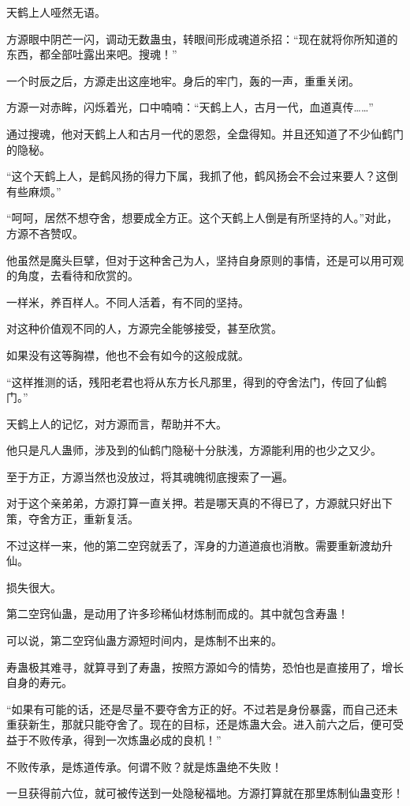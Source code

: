 \begin{this_body}
天鹤上人哑然无语。

方源眼中阴芒一闪，调动无数蛊虫，转眼间形成魂道杀招：“现在就将你所知道的东西，都全部吐露出来吧。搜魂！”

一个时辰之后，方源走出这座地牢。身后的牢门，轰的一声，重重关闭。

方源一对赤眸，闪烁着光，口中喃喃：“天鹤上人，古月一代，血道真传……”

通过搜魂，他对天鹤上人和古月一代的恩怨，全盘得知。并且还知道了不少仙鹤门的隐秘。

“这个天鹤上人，是鹤风扬的得力下属，我抓了他，鹤风扬会不会过来要人？这倒有些麻烦。”

“呵呵，居然不想夺舍，想要成全方正。这个天鹤上人倒是有所坚持的人。”对此，方源不吝赞叹。

他虽然是魔头巨擘，但对于这种舍己为人，坚持自身原则的事情，还是可以用可观的角度，去看待和欣赏的。

一样米，养百样人。不同人活着，有不同的坚持。

对这种价值观不同的人，方源完全能够接受，甚至欣赏。

如果没有这等胸襟，他也不会有如今的这般成就。

“这样推测的话，残阳老君也将从东方长凡那里，得到的夺舍法门，传回了仙鹤门。”

天鹤上人的记忆，对方源而言，帮助并不大。

他只是凡人蛊师，涉及到的仙鹤门隐秘十分肤浅，方源能利用的也少之又少。

至于方正，方源当然也没放过，将其魂魄彻底搜索了一遍。

对于这个亲弟弟，方源打算一直关押。若是哪天真的不得已了，方源就只好出下策，夺舍方正，重新复活。

不过这样一来，他的第二空窍就丢了，浑身的力道道痕也消散。需要重新渡劫升仙。

损失很大。

第二空窍仙蛊，是动用了许多珍稀仙材炼制而成的。其中就包含寿蛊！

可以说，第二空窍仙蛊方源短时间内，是炼制不出来的。

寿蛊极其难寻，就算寻到了寿蛊，按照方源如今的情势，恐怕也是直接用了，增长自身的寿元。

“如果有可能的话，还是尽量不要夺舍方正的好。不过若是身份暴露，而自己还未重获新生，那就只能夺舍了。现在的目标，还是炼蛊大会。进入前六之后，便可受益于不败传承，得到一次炼蛊必成的良机！”

不败传承，是炼道传承。何谓不败？就是炼蛊绝不失败！

一旦获得前六位，就可被传送到一处隐秘福地。方源打算就在那里炼制仙蛊变形！


\end{this_body}
